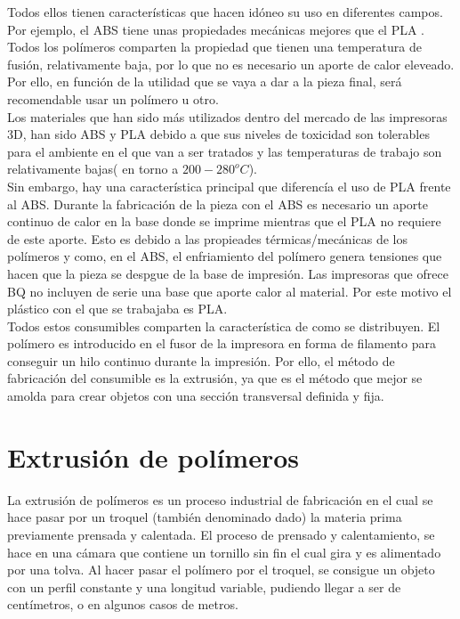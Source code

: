 Todos ellos tienen características que hacen idóneo su uso en diferentes campos. Por ejemplo, el ABS tiene unas propiedades mecánicas mejores que el PLA \cite{tfg_antonio}. Todos los polímeros comparten la propiedad que tienen una temperatura de fusión, relativamente baja, por lo que no es necesario un aporte de calor eleveado. Por ello, en función de la utilidad que se vaya a dar a la pieza final, será recomendable usar un polímero u otro.\\

Los materiales que han sido más utilizados dentro del mercado de las impresoras 3D, han sido ABS y PLA debido a que sus niveles de toxicidad son tolerables para el ambiente en el que van a ser tratados y las temperaturas de trabajo son relativamente bajas( en torno a $200-280 ^oC$).\\

Sin embargo, hay una característica principal que diferencía el uso de PLA frente al ABS. Durante la fabricación de la pieza con el ABS es necesario un aporte continuo de calor en la base donde se imprime mientras que el PLA no requiere de este aporte. Esto es debido a las propieades térmicas/mecánicas de los polímeros y como, en el ABS, el enfriamiento del polímero genera tensiones que hacen que la pieza se despgue de la base de impresión. Las impresoras que ofrece BQ no incluyen de serie una base que aporte calor al material. Por este motivo el plástico con el que se trabajaba es PLA.\\

Todos estos consumibles comparten la característica de como se distribuyen. El polímero es introducido en el fusor de la impresora en forma de filamento para conseguir un hilo continuo durante la impresión. Por ello, el método de fabricación del consumible es la extrusión, ya que es el método que mejor se amolda para crear objetos con una sección transversal definida y fija.

\section{Extrusión de polímeros}
\label{sec:extrusion}

La extrusión de polímeros es un proceso industrial de fabricación en el cual se hace pasar por un troquel (también denominado dado) la materia prima previamente prensada y calentada. El proceso de prensado y calentamiento, se hace en una cámara que contiene un tornillo sin fin el cual gira y es alimentado por una tolva. Al hacer pasar el polímero por el troquel, se consigue un objeto con un perfil constante y una longitud variable, pudiendo llegar a ser de centímetros, o en algunos casos de metros.\\

